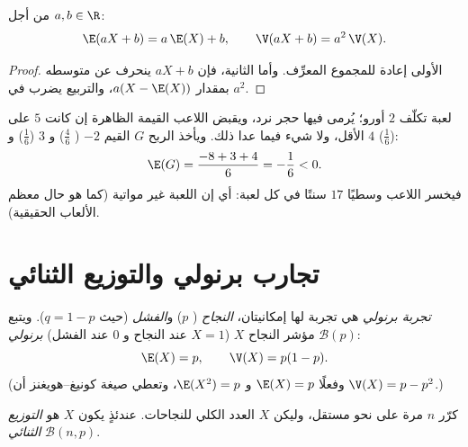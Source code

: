 \begin{proposition}\label{prop:g12:randvar:affine}
من أجل $a, b \in \R$:
\[
\E(aX + b) = a\,\E(X) + b, \qquad
\V(aX + b) = a^2\,\V(X) .
\]
\end{proposition}

\begin{proof}
الأولى إعادة  للمجموع المعرِّف. وأما الثانية، فإن $aX + b$
ينحرف عن متوسطه بمقدار $a(X - \E(X))$، والتربيع يضرب في
$a^2$.
\end{proof}

\begin{example}\label{ex:g12:randvar:game}
لعبة تكلّف $2$ أورو؛ يُرمى فيها حجر نرد، ويقبض اللاعب القيمة
الظاهرة إن كانت $5$ على الأقل، ولا شيء فيما عدا ذلك. ويأخذ الربح $G$ القيم
$-2$ ( $\frac46$) و $3$ ($\frac16$) و $4$ ($\frac16$):
\[
\E(G) = \frac{-8 + 3 + 4}{6} = -\frac{1}{6} < 0 .
\]
فيخسر اللاعب وسطيًا $17$ سنتًا في كل لعبة: أي إن اللعبة غير مواتية
(كما هو حال معظم الألعاب الحقيقية).
\end{example}

\section{تجارب برنولي والتوزيع الثنائي}

\begin{definition}\label{def:g12:randvar:bernoulli}
\emph{تجربة برنولي} هي تجربة لها إمكانيتان،
\emph{النجاح} ( $p$) و\emph{الفشل}
(حيث $q = 1 - p$). ويتبع مؤشر النجاح $X$ ($X = 1$ عند النجاح و $0$ عند
الفشل) \emph{ برنولي} $\mathcal B(p)$:
\[
\E(X) = p, \qquad \V(X) = p(1-p) .
\]
(وفعلًا $\E(X) = p$ و $\E(X^2) = p$، وتعطي صيغة كونيغ--هويغنز أن
$\V(X) = p - p^2$.)
\end{definition}

\begin{definition}\label{def:g12:randvar:binomial}
كرّر  $n$ مرة على نحو مستقل، وليكن $X$ العدد الكلي
للنجاحات. عندئذٍ يكون  $X$ هو \emph{التوزيع
الثنائي} $\mathcal B(n, p)$.
\end{definition}

